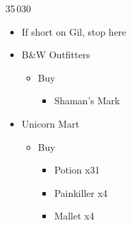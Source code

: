 \begin{shop}{35\,030}
\begin{multicols}{2}
\begin{itemize}
\begin{itemize}
    \end{itemize}
    \item If short on Gil, stop here
    \item B\&W Outfitters
    \begin{itemize}
        \item Buy
        \begin{itemize}
            \item Shaman's Mark
        \end{itemize}
    \end{itemize}
    \item Unicorn Mart
    \begin{itemize}
        \item Buy
        \begin{itemize}
            \item Potion x31
            \item Painkiller x4
            \item Mallet x4
        \end{itemize}
    \end{itemize}
\end{itemize}
\end{multicols}
\end{shop}

